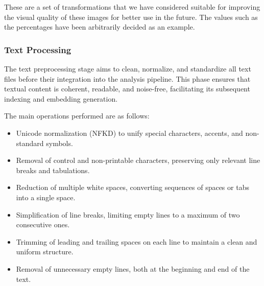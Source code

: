 \documentclass[12pt]{article}
\begin{document}
These are a set of transformations that we have considered suitable for improving the visual quality of these images for better use in the future. The values such as the percentages have been arbitrarily decided as an example.

\subsubsection{Text Processing}
The text preprocessing stage aims to clean, normalize, and standardize all text files before their integration into the analysis pipeline.
This phase ensures that textual content is coherent, readable, and noise-free, facilitating its subsequent indexing and embedding generation.

The main operations performed are as follows:

\begin{itemize}
    \item Unicode normalization (NFKD) to unify special characters, accents, and non-standard symbols.
\end{itemize}

\begin{itemize}
    \item Removal of control and non-printable characters, preserving only relevant line breaks and tabulations.
\end{itemize}

\begin{itemize}
    \item Reduction of multiple white spaces, converting sequences of spaces or tabs into a single space.
\end{itemize}

\begin{itemize}
    \item Simplification of line breaks, limiting empty lines to a maximum of two consecutive ones.
\end{itemize}

\begin{itemize}
    \item Trimming of leading and trailing spaces on each line to maintain a clean and uniform structure.
\end{itemize}

\begin{itemize}
    \item Removal of unnecessary empty lines, both at the beginning and end of the text.
\end{itemize}
\end{document}
